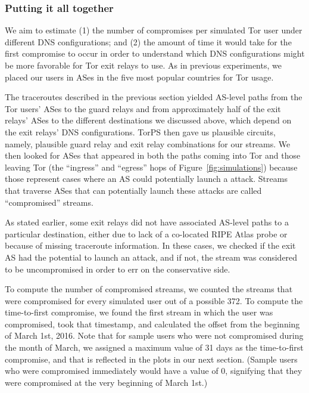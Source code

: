 \subsubsection{Putting it all together}
We aim to estimate (1) the number of compromises per simulated 
Tor user under different DNS configurations; and (2) the amount of 
time it would take for the first compromise to occur 
in order to understand which DNS configurations 
might be more favorable for Tor exit relays to use. As in previous 
experiments, we placed our users in ASes in the five most popular 
countries for Tor usage.

The traceroutes described in the previous section yielded AS-level paths from 
the Tor users' ASes to the guard relays and from approximately half of the exit 
relays' ASes to the different destinations we discussed above, which depend on the exit  
relays' DNS configurations. TorPS then gave us plausible 
circuits, namely, plausible guard relay and exit relay combinations for our 
streams. We then looked for ASes that appeared in both the paths coming into Tor and those 
leaving Tor (the ``ingress'' and ``egress'' hops of Figure~\ref{fig:simulations}) 
because those represent cases where an AS could potentially launch a \name attack. 
Streams that traverse ASes that can potentially launch these attacks are called 
``compromised'' streams.

As stated earlier, some exit relays did not have associated AS-level paths to a particular 
destination, either due to lack of a co-located RIPE Atlas probe or because of missing 
traceroute information. In these cases, we checked if the exit AS had the potential 
to launch an attack, and if not, the stream was considered to be uncompromised in order to 
err on the conservative side. 

To compute the number of compromised streams, we counted the streams that were compromised 
for every simulated user out of a possible 372. To compute the time-to-first compromise, 
we found the first stream in which the user was compromised, took that timestamp, and 
calculated the offset from the beginning of March 1st, 2016. Note that for sample users 
who were not compromised during the month of March, we assigned a maximum value 
of 31 days as the time-to-first compromise, and that is reflected in the plots in our 
next section. (Sample users who were compromised immediately would have a value of 0, 
signifying that they were compromised at the very beginning of March 1st.)

